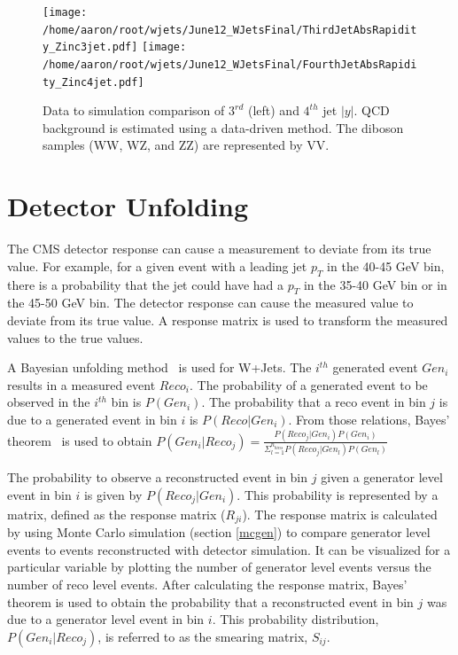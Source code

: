 \documentclass[oneside, letterpaper, oldfontcommands]{memoir}
\begin{document}
\begin{table}
\begin{figure}[!Hhtbp]
\begin{center}
\texttt{[image: /home/aaron/root/wjets/June12\_WJetsFinal/ThirdJetAbsRapidity\_Zinc3jet.pdf]}
\texttt{[image: /home/aaron/root/wjets/June12\_WJetsFinal/FourthJetAbsRapidity\_Zinc4jet.pdf]}
\end{center}
\caption{Data to simulation comparison of $3^{rd}$ (left) and $4^{th}$ jet $|y|$. QCD background is estimated using a data-driven method. The diboson samples (WW, WZ, and ZZ) are represented by VV.}
\label{eta34}
\end{figure}


\section{Detector Unfolding}
\qquad The CMS detector response can cause a measurement to deviate from its true value. For example, for a given event with a leading jet $p_{T}$ in the 40-45 GeV bin, there is a probability that the jet could have had a $p_{T}$ in the 35-40 GeV bin or in the 45-50 GeV bin. The detector response can cause the measured value to deviate from its true value. A response matrix is used to transform the measured values to the true values. 

\qquad A Bayesian unfolding method~\cite{D'Agostini:1995487} is used for W+Jets. The $i^{th}$ generated event $Gen_{i}$ results in a measured event $Reco_{i}$. The probability of a generated event to be observed in the $i^{th}$ bin is $P(Gen_{i})$. The probability that a reco event in bin $j$ is due to a generated event in bin $i$ is $P(Reco|Gen_{i})$. From those relations, Bayes' theorem~\cite{BevingtonRobinson200207} is used to obtain $P(Gen_{i}|Reco_{j}) = \frac{P(Reco_{j}|Gen_{i})P(Gen_{i})}{\Sigma_{l=1}^{n_{bins}}P(Reco_{j}|Gen_{l})P(Gen_{l})}$

\qquad The probability to observe a reconstructed event in bin $j$ given a generator level event in bin $i$ is given by $P(Reco_{j}|Gen_{i})$. This probability is represented by a matrix, defined as the response matrix ($R_{ji}$). The response matrix is calculated by using Monte Carlo simulation (section \ref{mcgen}) to compare generator level events to events reconstructed with detector simulation. It can be visualized for a particular variable by plotting the number of generator level events versus the number of reco level events. After calculating the response matrix, Bayes' theorem is used to obtain the probability that a reconstructed event in bin $j$ was due to a generator level event in bin $i$. This probability distribution, $P(Gen_{i}|Reco_{j})$, is referred to as the smearing matrix, $S_{ij}$.


\end{table}
\end{document}
